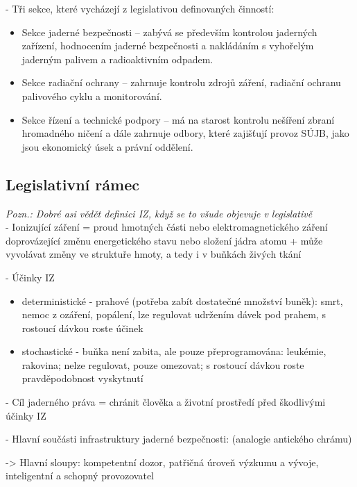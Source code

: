- Tři sekce, které vycházejí z legislativou definovaných činností:

\begin{itemize}
    \item Sekce jaderné bezpečnosti – zabývá se především kontrolou jaderných zařízení, hodnocením jaderné bezpečnosti a nakládáním s vyhořelým jaderným palivem a radioaktivním odpadem.
    \item Sekce radiační ochrany – zahrnuje kontrolu zdrojů záření, radiační ochranu palivového cyklu a monitorování. 

    \item Sekce řízení a technické podpory – má na starost kontrolu nešíření zbraní hromadného ničení a dále zahrnuje odbory, které zajišťují provoz SÚJB, jako jsou ekonomický úsek a právní oddělení.
\end{itemize}


\subsection{Legislativní rámec}

\noindent\textit{Pozn.: Dobré asi vědět definici IZ, když se to všude objevuje v legislativě}
\\

\noindent - 	Ionizující záření = proud hmotných části nebo elektromagnetického záření doprovázející změnu energetického stavu nebo složení jádra atomu + může vyvolávat změny ve struktuře hmoty, a tedy i v buňkách živých tkání

\noindent - 	Účinky IZ
\begin{itemize}
	\item deterministické - prahové (potřeba zabít dostatečné množství buněk): smrt, nemoc z ozáření, popálení, lze regulovat udržením dávek pod prahem, s rostoucí dávkou roste účinek
	\item stochastické - buňka není zabita, ale pouze přeprogramována: leukémie, rakovina; nelze regulovat, pouze omezovat; s rostoucí dávkou roste pravděpodobnost vyskytnutí
\end{itemize}

\noindent - 	Cíl jaderného práva = chránit člověka a životní prostředí před škodlivými účinky IZ

\noindent- Hlavní součásti infrastruktury jaderné bezpečnosti: (analogie antického chrámu)

->	Hlavní sloupy: kompetentní dozor, patřičná úroveň výzkumu a vývoje, inteligentní a schopný provozovatel

